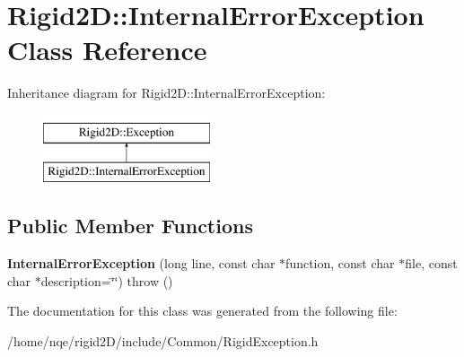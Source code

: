 \hypertarget{class_rigid2_d_1_1_internal_error_exception}{
\section{Rigid2D::InternalErrorException Class Reference}
\label{class_rigid2_d_1_1_internal_error_exception}
}
Inheritance diagram for Rigid2D::InternalErrorException:\begin{figure}[H]
\begin{center}
\leavevmode
\includegraphics[height=2cm]{class_rigid2_d_1_1_internal_error_exception}
\end{center}
\end{figure}
\subsection*{Public Member Functions}
\begin{DoxyCompactItemize}
\item 
\hypertarget{class_rigid2_d_1_1_internal_error_exception_a42a2732a4cc6e4067fbb958e76529811}{
{\bfseries InternalErrorException} (long line, const char $\ast$function, const char $\ast$file, const char $\ast$description=\char`\"{}\char`\"{})  throw ()}
\label{class_rigid2_d_1_1_internal_error_exception_a42a2732a4cc6e4067fbb958e76529811}

\end{DoxyCompactItemize}


The documentation for this class was generated from the following file:\begin{DoxyCompactItemize}
\item 
/home/nqe/rigid2D/include/Common/RigidException.h\end{DoxyCompactItemize}
